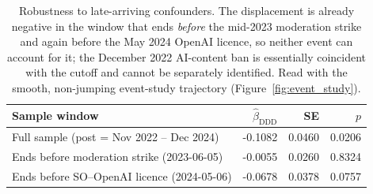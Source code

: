 \begin{table}[ht]
\centering
\caption{Robustness to late-arriving confounders. The displacement is already negative in the window that ends \emph{before} the mid-2023 moderation strike and again before the May 2024 OpenAI licence, so neither event can account for it; the December 2022 AI-content ban is essentially coincident with the cutoff and cannot be separately identified. Read with the smooth, non-jumping event-study trajectory (Figure~\ref{fig:event_study}).}
\label{tab:late_confounders}
\small
\begin{tabular}{lrrr}
\toprule
Sample window & $\hat\beta_{\text{DDD}}$ & SE & $p$ \\
\midrule
Full sample (post = Nov 2022 -- Dec 2024) & -0.1082 & 0.0460 & 0.0206 \\
Ends before moderation strike (2023-06-05) & -0.0055 & 0.0260 & 0.8324 \\
Ends before SO--OpenAI licence (2024-05-06) & -0.0678 & 0.0378 & 0.0757 \\
\bottomrule
\end{tabular}
\end{table}